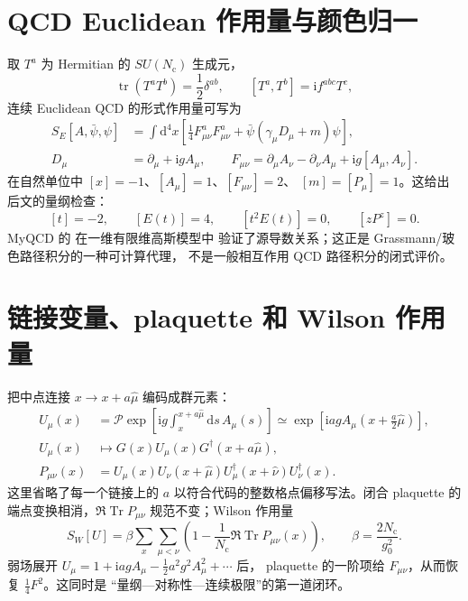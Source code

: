 \documentclass[UTF8,11pt,oneside]{ctexbook}
\newcommand{\Tr}{\operatorname{Tr}}
\newcommand{\dd}{\mathrm{d}}
\newcommand{\ii}{\mathrm{i}}
\newcommand{\Nc}{N_{\mathrm c}}
\begin{document}
\section{QCD Euclidean 作用量与颜色归一}
取 \(T^a\) 为 Hermitian 的 \(SU(\Nc)\) 生成元，
\[
 \operatorname{tr}(T^aT^b)=\frac12\delta^{ab},\qquad
 [T^a,T^b]=\ii f^{abc}T^c,
\]
连续 Euclidean QCD 的形式作用量可写为
\begin{align}
 S_E[A,\bar\psi,\psi]
 &=\int\dd^4x\left[
 \frac14F^a_{\mu\nu}F^a_{\mu\nu}
 +\bar\psi(\gamma_\mu D_\mu+m)\psi\right],\\
 D_\mu&=\partial_\mu+\ii g A_\mu,\qquad
 F_{\mu\nu}=\partial_\mu A_\nu-\partial_\nu A_\mu
 +\ii g[A_\mu,A_\nu].
\end{align}
在自然单位中 \([x]=-1\)、\([A_\mu]=1\)、\([F_{\mu\nu}]=2\)、
\([m]=[P_\mu]=1\)。这给出后文的量纲检查：
\[
 [t]=-2,\qquad [E(t)]=4,\qquad [t^2E(t)]=0,\qquad
 [zP^z]=0.
\]
MyQCD 的  在一维有限维高斯模型中
验证了源导数关系；这正是 Grassmann/玻色路径积分的一种可计算代理，
不是一般相互作用 QCD 路径积分的闭式评价。

\section{链接变量、plaquette 和 Wilson 作用量}
\label{sec:lattice-map}
把中点连接 \(x\to x+a\hat\mu\) 编码成群元素：
\begin{align}
 U_\mu(x)&=\mathcal P\exp\!\left[\ii g\int_x^{x+a\hat\mu}
 \dd s\,A_\mu(s)\right]
 \simeq \exp\!\left[\ii ag A_\mu(x+\tfrac a2\hat\mu)\right],\\
 U_\mu(x)&\mapsto G(x)U_\mu(x)G^\dagger(x+a\hat\mu),\\
 P_{\mu\nu}(x)&=U_\mu(x)U_\nu(x+\hat\mu)
 U_\mu^\dagger(x+\hat\nu)U_\nu^\dagger(x).
\end{align}
这里省略了每一个链接上的 \(a\) 以符合代码的整数格点偏移写法。闭合
plaquette 的端点变换相消，\(\Re\Tr P_{\mu\nu}\) 规范不变；Wilson 作用量
\[
 S_W[U]=\beta\sum_x\sum_{\mu<\nu}
 \left(1-\frac1{\Nc}\Re\Tr P_{\mu\nu}(x)\right),
 \qquad \beta=\frac{2\Nc}{g_0^2}.
\]
弱场展开 \(U_\mu=1+\ii agA_\mu-\frac12a^2g^2A_\mu^2+\cdots\) 后，
plaquette 的一阶项给 \(F_{\mu\nu}\)，从而恢复 \(\frac14F^2\)。这同时是
“量纲—对称性—连续极限”的第一道闭环。
\end{document}
